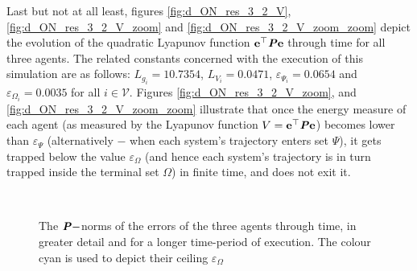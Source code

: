 Last but not at all least, figures
\eqref{fig:d_ON_res_3_2_V}, \eqref{fig:d_ON_res_3_2_V_zoom} and
\eqref{fig:d_ON_res_3_2_V_zoom_zoom} depict
the evolution of the quadratic Lyapunov function
$\bm{\mathbf{e}}^{\top} \bm{\mathit{P}} \bm{\mathbf{e}}$ through time for all three agents.
The related constants concerned with the execution
of this simulation are as follows: $L_{g_i} = 10.7354$, $L_{V_i} = 0.0471$,
$\varepsilon_{\Psi_i} = 0.0654$ and $\varepsilon_{\Omega_i} = 0.0035$ for
all $i \in \mathcal{V}$. Figures \eqref{fig:d_ON_res_3_2_V_zoom},
and \eqref{fig:d_ON_res_3_2_V_zoom_zoom}
illustrate that once the energy measure of each agent (as measured by
the Lyapunov function $V = \bm{\mathbf{e}}^{\top} \bm{\mathit{P}} \bm{\mathbf{e}}$) becomes lower than
$\varepsilon_{\Psi}$ (alternatively $-$ when each system's trajectory enters
set $\Psi$), it gets trapped below the value $\varepsilon_{\Omega}$ (and
hence each system's trajectory is in turn trapped inside the terminal
set $\Omega$) in finite time, and does not exit it.


\noindent{}\\[2.5ex]

\begin{figure}[H]\centering
  \scalebox{0.7}{}
  \caption{The $\bm{\mathit{P}}-$norms of the errors of the three agents through time,
    in greater detail and for a longer time-period of execution. The colour
    cyan is used to depict their ceiling $\varepsilon_{\Omega}$}
  \label{fig:d_ON_res_3_2_V_zoom_zoom}
\end{figure}

